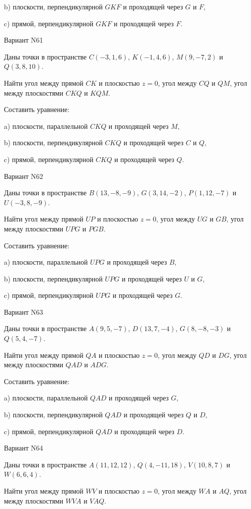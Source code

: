 \documentclass[11pt]{report}
\begin{document}
b) плоскости, перпендикулярной $GKF$ и проходящей через $G$ и $F$,

c) прямой, перпендикулярной $GKF$ и проходящей через $F$.

Вариант N61

Даны точки в пространстве
$C(-3, 1, 6)$, $K(-1, 4, 6)$, $M(9, -7, 2)$ и
$Q(3, 8, 10)$.

Найти угол между прямой $CK$ и плоскостью $z = 0$, угол между $CQ$ и $QM$, угол между плоскостями $CKQ$ 
и $KQM$.

Составить уравнение: 

a) плоскости, параллельной $CKQ$ и проходящей через $M$,

b) плоскости, перпендикулярной $CKQ$ и проходящей через $C$ и $Q$,

c) прямой, перпендикулярной $CKQ$ и проходящей через $Q$.

Вариант N62

Даны точки в пространстве
$B(13, -8, -9)$, $G(3, 14, -2)$, $P(1, 12, -7)$ и
$U(-3, 8, -9)$.

Найти угол между прямой $UP$ и плоскостью $z = 0$, угол между $UG$ и $GB$, угол между плоскостями $UPG$ 
и $PGB$.

Составить уравнение: 

a) плоскости, параллельной $UPG$ и проходящей через $B$,

b) плоскости, перпендикулярной $UPG$ и проходящей через $U$ и $G$,

c) прямой, перпендикулярной $UPG$ и проходящей через $G$.

Вариант N63

Даны точки в пространстве
$A(9, 5, -7)$, $D(13, 7, -4)$, $G(8, -8, -3)$ и
$Q(5, 4, -7)$.

Найти угол между прямой $QA$ и плоскостью $z = 0$, угол между $QD$ и $DG$, угол между плоскостями $QAD$ 
и $ADG$.

Составить уравнение: 

a) плоскости, параллельной $QAD$ и проходящей через $G$,

b) плоскости, перпендикулярной $QAD$ и проходящей через $Q$ и $D$,

c) прямой, перпендикулярной $QAD$ и проходящей через $D$.

Вариант N64

Даны точки в пространстве
$A(11, 12, 12)$, $Q(4, -11, 18)$, $V(10, 8, 7)$ и
$W(6, 6, 4)$.

Найти угол между прямой $WV$ и плоскостью $z = 0$, угол между $WA$ и $AQ$, угол между плоскостями $WVA$ 
и $VAQ$.
\end{document}
